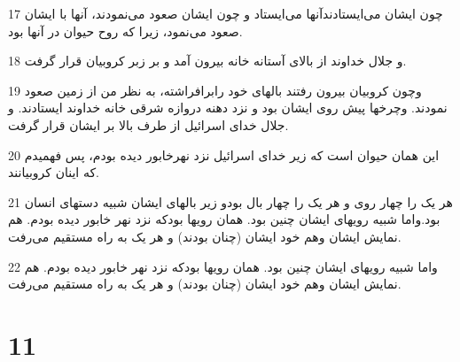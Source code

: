 \par 17 چون ایشان می‌ایستادندآنها می‌ایستاد و چون ایشان صعود می‌نمودند، آنها با ایشان صعود می‌نمود، زیرا که روح حیوان در آنها بود.
\par 18 و جلال خداوند از بالای آستانه خانه بیرون آمد و بر زبر کروبیان قرار گرفت.
\par 19 وچون کروبیان بیرون رفتند بالهای خود رابرافراشته، به نظر من از زمین صعود نمودند. وچرخها پیش روی ایشان بود و نزد دهنه دروازه شرقی خانه خداوند ایستادند. و جلال خدای اسرائیل از طرف بالا بر ایشان قرار گرفت.
\par 20 این همان حیوان است که زیر خدای اسرائیل نزد نهرخابور دیده بودم، پس فهمیدم که اینان کروبیانند.
\par 21 هر یک را چهار روی و هر یک را چهار بال بودو زیر بالهای ایشان شبیه دستهای انسان بود.واما شبیه رویهای ایشان چنین بود. همان رویها بودکه نزد نهر خابور دیده بودم. هم نمایش ایشان وهم خود ایشان (چنان بودند) و هر یک به راه مستقیم می‌رفت.
\par 22 واما شبیه رویهای ایشان چنین بود. همان رویها بودکه نزد نهر خابور دیده بودم. هم نمایش ایشان وهم خود ایشان (چنان بودند) و هر یک به راه مستقیم می‌رفت.

\chapter{11}

